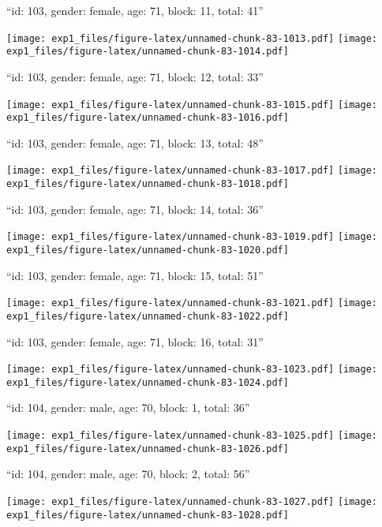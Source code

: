\documentclass[11pt,,]{article}
\begin{document}
\newpage
[1] 

``id: 103, gender: female, age: 71, block: 11, total: 41''

\texttt{[image: exp1\_files/figure-latex/unnamed-chunk-83-1013.pdf]}
\texttt{[image: exp1\_files/figure-latex/unnamed-chunk-83-1014.pdf]}

\newpage
[1] 

``id: 103, gender: female, age: 71, block: 12, total: 33''

\texttt{[image: exp1\_files/figure-latex/unnamed-chunk-83-1015.pdf]}
\texttt{[image: exp1\_files/figure-latex/unnamed-chunk-83-1016.pdf]}

\newpage
[1] 

``id: 103, gender: female, age: 71, block: 13, total: 48''

\texttt{[image: exp1\_files/figure-latex/unnamed-chunk-83-1017.pdf]}
\texttt{[image: exp1\_files/figure-latex/unnamed-chunk-83-1018.pdf]}

\newpage
[1] 

``id: 103, gender: female, age: 71, block: 14, total: 36''

\texttt{[image: exp1\_files/figure-latex/unnamed-chunk-83-1019.pdf]}
\texttt{[image: exp1\_files/figure-latex/unnamed-chunk-83-1020.pdf]}

\newpage
[1] 

``id: 103, gender: female, age: 71, block: 15, total: 51''

\texttt{[image: exp1\_files/figure-latex/unnamed-chunk-83-1021.pdf]}
\texttt{[image: exp1\_files/figure-latex/unnamed-chunk-83-1022.pdf]}

\newpage
[1] 

``id: 103, gender: female, age: 71, block: 16, total: 31''

\texttt{[image: exp1\_files/figure-latex/unnamed-chunk-83-1023.pdf]}
\texttt{[image: exp1\_files/figure-latex/unnamed-chunk-83-1024.pdf]}

\newpage
[1] 

``id: 104, gender: male, age: 70, block: 1, total: 36''

\texttt{[image: exp1\_files/figure-latex/unnamed-chunk-83-1025.pdf]}
\texttt{[image: exp1\_files/figure-latex/unnamed-chunk-83-1026.pdf]}

\newpage
[1] 

``id: 104, gender: male, age: 70, block: 2, total: 56''

\texttt{[image: exp1\_files/figure-latex/unnamed-chunk-83-1027.pdf]}
\texttt{[image: exp1\_files/figure-latex/unnamed-chunk-83-1028.pdf]}
\end{document}
